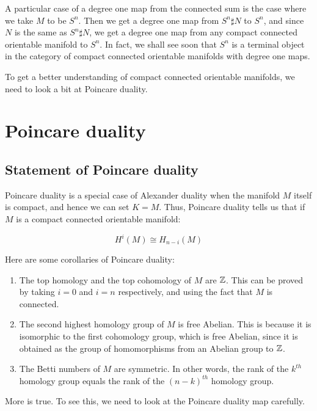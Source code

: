 \documentclass[a4paper]{amsart}
\begin{document}
A particular case of a degree one map from the connected sum is the
case where we take $M$ to be $S^n$. Then we get a degree one map from
$S^n \sharp N$ to $S^n$, and since $N$ is the same as $S^n \sharp N$,
we get a degree one map from any compact connected orientable manifold
to $S^n$. In fact, we shall see soon that $S^n$ is a terminal object
in the category of compact connected orientable manifolds with degree
one maps.

To get a better understanding of compact connected orientable
manifolds, we need to look a bit at Poincare duality.

\section{Poincare duality}

\subsection{Statement of Poincare duality}

Poincare duality is a special case of Alexander duality when the
manifold $M$ itself is compact, and hence we can set $K = M$. Thus,
Poincare duality tells us that if $M$ is a compact connected
orientable manifold:

$$H^i(M) \cong H_{n-i}(M)$$

Here are some corollaries of Poincare duality:

\begin{enumerate}

\item The top homology and the top cohomology of $M$ are $\mathbb{Z}$.
  This can be proved by taking $i = 0$ and $i = n$ respectively,
  and using the fact that $M$ is connected.

\item The second highest homology group of $M$ is free Abelian.  This
  is because it is isomorphic to the first cohomology group, which is
  free Abelian, since it is obtained as the group of homomorphisms
  from an Abelian group to $\mathbb{Z}$.

\item The Betti numbers of $M$ are symmetric. In other words, the rank
  of the $k^{th}$ homology group equals the rank of the $(n-k)^{th}$
  homology group.

\end{enumerate}

More is true. To see this, we need to look at the Poincare duality map
carefully.
\end{document}
